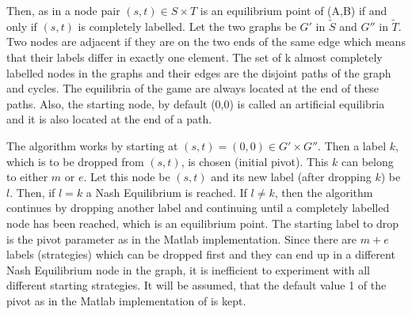 Then, as in \citep{shapley1974note} a node pair $(s,t) \in S \times T$ is an equilibrium point of (A,B) if and only if $(s,t)$ is completely labelled. Let the two graphs be $G'$ in $\tilde{S}$ and $G''$ in $\tilde{T}$. Two nodes are adjacent if they are on the two ends of the same edge which means that their labels differ in exactly one element. The set of k almost completely labelled nodes in the graphs and their edges are the disjoint paths of the graph and cycles. The equilibria of the game are always located at the end of these paths. Also, the starting node, by default (0,0) is called an artificial equilibria and it is also located at the end of a path.

The algorithm works by starting at $(s,t) = (0,0) \in G' \times G'' $. Then a label $k$, which is to be dropped from $(s,t)$, is chosen (initial pivot). This $k$ can belong to either $m$ or $e$. Let this node be $(s,t)$ and its new label (after dropping $k$) be $l$. Then, if $l=k$ a Nash Equilibrium is reached. If $l\neq k$, then the algorithm continues by dropping another label and continuing until a completely labelled node has been reached, which is an equilibrium point. The starting label to drop is the pivot parameter as in the Matlab implementation. Since there are $m+e$ labels (strategies) which can be dropped first and they can end up in a different Nash Equilibrium node in the graph, it is inefficient to experiment with all different starting strategies. It will be assumed, that the default value 1 of the pivot as in the Matlab implementation of \citep{lemkeHowson2014Matlab} is kept.

